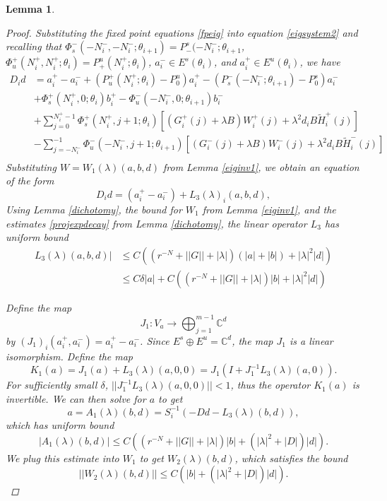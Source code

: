 \documentclass[12pt]{elsarticle}
\def\C{{\mathbb C}}
\newtheorem{lemma}{Lemma}
\begin{document}
\begin{lemma}
\begin{proof}
Substituting the fixed point equations \eqref{fpeig} into equation \eqref{eigsystem2} and recalling that $\Phi_s^-(-N_i^-, -N_i^-; \theta_{i+1}) = P_-^s(-N_i^-; \theta_{i+1}$, $\Phi_u^+(N_i^+, N_i^+; \theta_i) = P_+^u(N_i^+; \theta_{i})$, $a_i^- \in E^s(\theta_i)$, and $a_i^+ \in E^u(\theta_i)$, we have
\begin{align}
D_i d &= a_i^+ - a_i^- + (P_u^+(N_i^+; \theta_i) - P_0^u) a_i^+ - (P_s^-(-N_i^-; \theta_{i+1}) - P_0^s) a_i^- \\
&+ \Phi_s^+(N_i^+, 0; \theta_i) b_i^+ - \Phi_u^-(-N_i^-, 0; \theta_{i+1}) b_i^- \nonumber \\
&+ \sum_{j = 0}^{N_i^+-1} \Phi_s^+(N_i^+, j+1; \theta_i) 
[(G_i^+(j) + \lambda B) W_i^+(j) + \lambda^2 d_i B \tilde{H}_i^+(j)] \nonumber \\
&- \sum_{j = -N_i^-}^{-1} \Phi_u^-(-N_i^-, j+1; \theta_{i+1}) 
[(G_i^-(j) + \lambda B) W_i^-(j) + \lambda^2 d_i B \tilde{H}_i^-(j)] \nonumber \\
\end{align}
Substituting $W = W_1(\lambda)(a, b, d)$ from Lemma \ref{eiginv1}, we obtain an equation of the form 
\begin{equation}\label{Dideq2}
D_i d = (a_i^+ - a_i^-) + L_3(\lambda)_i(a,b,d),
\end{equation}
Using Lemma \ref{dichotomy}, the bound for $W_1$ from Lemma \ref{eiginv1}, and the estimates \eqref{projexpdecay} from Lemma \ref{dichotomy}, the linear operator $L_3$ has uniform bound
\begin{align}\label{L3bound}
L_3(\lambda)(a,b,d)| &\leq C\left( (r^{-N} + ||G|| + |\lambda| ) (|a| + |b|) + |\lambda|^2 |d|  \right) \\
&\leq C \delta |a| + C\left( (r^{-N} + ||G|| + |\lambda| ) |b| + |\lambda|^2 |d|  \right) \nonumber
\end{align}

Define the map
\[
J_1: V_a \rightarrow \bigoplus_{j=1}^{m-1} \C^d
\]
by $(J_1)_i(a_i^+, a_i^-) = a_i^+ - a_i^-$. Since $E^s \oplus E^u = \C^d$, the map $J_1$ is a linear isomorphism. Define the map
\[
K_1(a) = J_1 (a) + L_3(\lambda)(a, 0, 0) = J_1( I + J_1^{-1} L_3(\lambda)(a, 0) ).
\]
For sufficiently small $\delta$, $||J_1^{-1} L_3(\lambda)(a, 0, 0)|| < 1$, thus the operator $K_1(a)$ is invertible. We can then solve for $a$ to get
\[
a = A_1(\lambda)(b, d) = S_i^{-1}(-D d - L_3(\lambda)(b, d)),
\]
which has uniform bound
\begin{equation*}
|A_1(\lambda)(b, d)| \leq C \left( (r^{-N} + ||G|| + |\lambda| ) |b| + (|\lambda|^2 + |D| ) |d|  \right).
\end{equation*}
We plug this estimate into $W_1$ to get $W_2(\lambda)(b,d)$, which satisfies the bound
\begin{equation*}
||W_2(\lambda)(b,d)|| \leq C \left( |b| + (|\lambda|^2 + |D|) |d| \right).
\end{equation*}


\end{proof}
\end{lemma}
\end{document}
